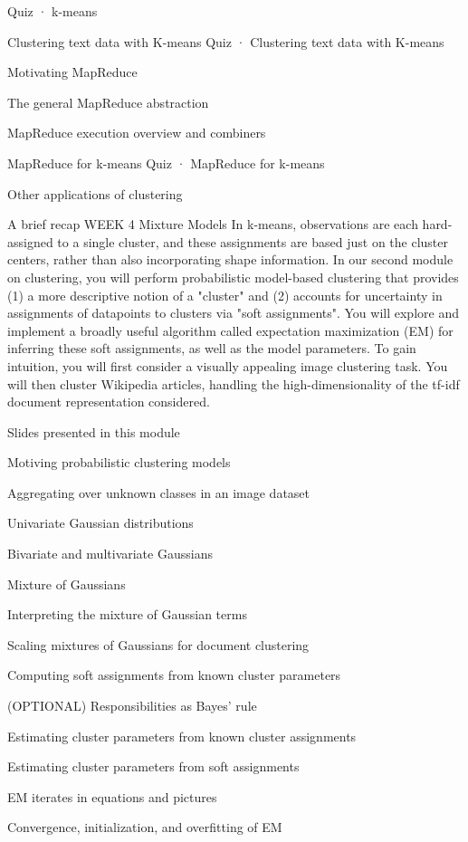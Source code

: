 Quiz · k-means
\item Clustering text data with K-means
Quiz · Clustering text data with K-means
\item Motivating MapReduce
\item The general MapReduce abstraction
\item MapReduce execution overview and combiners
\item MapReduce for k-means
Quiz · MapReduce for k-means
\item Other applications of clustering
\item A brief recap
WEEK 4
Mixture Models
In k-means, observations are each hard-assigned to a single cluster, and these assignments are based just on the cluster centers, rather than also incorporating shape information. In our second module on clustering, you will perform probabilistic model-based clustering that provides (1) a more descriptive notion of a "cluster" and (2) accounts for uncertainty in assignments of datapoints to clusters via "soft assignments". You will explore and implement a broadly useful algorithm called expectation maximization (EM) for inferring these soft assignments, as well as the model parameters. To gain intuition, you will first consider a visually appealing image clustering task. You will then cluster Wikipedia articles, handling the high-dimensionality of the tf-idf document representation considered.
\item Slides presented in this module
\item Motiving probabilistic clustering models
\item Aggregating over unknown classes in an image dataset
\item Univariate Gaussian distributions
\item Bivariate and multivariate Gaussians
\item Mixture of Gaussians
\item Interpreting the mixture of Gaussian terms
\item Scaling mixtures of Gaussians for document clustering
\item Computing soft assignments from known cluster parameters
\item (OPTIONAL) Responsibilities as Bayes' rule
\item Estimating cluster parameters from known cluster assignments
\item Estimating cluster parameters from soft assignments
\item EM iterates in equations and pictures
\item Convergence, initialization, and overfitting of EM
